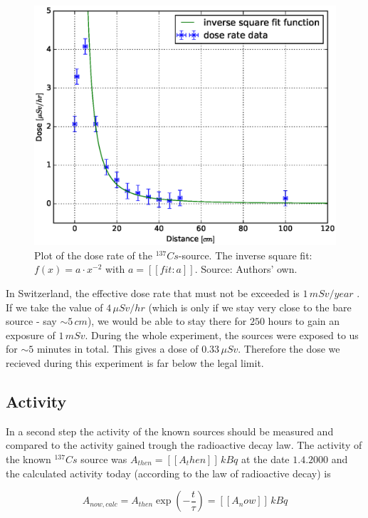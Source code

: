 \documentclass[a4paper]{article}
\begin{document}
\begin{figure}[H]
\centering
\includegraphics[width=1.0\textwidth]{plots/dose_rate.eps}
\caption{Plot of the dose rate of the $^{137}Cs$-source. The inverse square fit: $f(x) = a \cdot x^{-2}$ with $a = [[fit:a]]$. Source: Authors' own.}
\label{fig:dose_rate}
\end{figure}

In Switzerland, the effective dose rate that must not be exceeded is $1 \, mSv / year$ \cite{strahlenschutzverordnung}. If we take the value of $4 \, \mu Sv / hr$ (which is only if we stay very close to the bare source - say $\sim 5 \, cm$), we would be able to stay there for $250$ hours to gain an exposure of $1 \, mSv$. During the whole experiment, the sources were exposed to us for $\sim 5$ minutes in total. This gives a dose of $0.33 \, \mu Sv$. Therefore the dose we recieved during this experiment is far below the legal limit.

\subsection{Activity}

In a second step the activity of the known sources should be measured and compared to the activity gained trough the radioactive decay law. The activity of the known $^{137}Cs$ source was $A_{then} = [[A_then]] \, kBq$ at the date $1.4.2000$ and the calculated activity today (according to the law of radioactive decay) is

\begin{equation}
A_{now,calc} = A_{then} \exp{\left( -\frac{t}{\tau} \right)} = [[A_now]] \, kBq
\label{eq:decay_law}
\end{equation}
\end{document}
